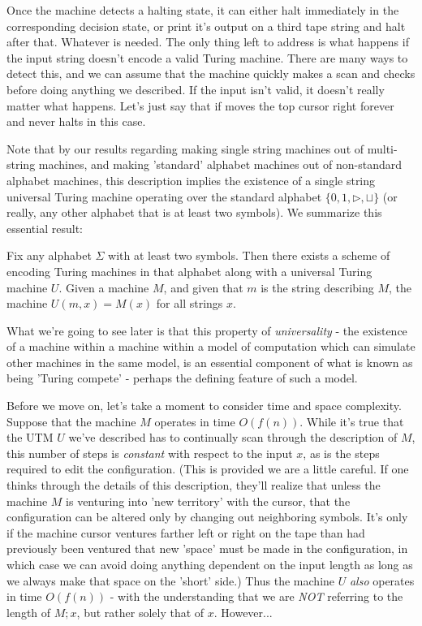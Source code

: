 Once the machine detects a halting state, it can either halt immediately in the corresponding decision state, or print it's output on a third tape string and halt after that. Whatever is needed. The only thing left to address is what happens if the input string doesn't encode a valid Turing machine. There are many ways to detect this, and we can assume that the machine quickly makes a scan and checks before doing anything we described. If the input isn't valid, it doesn't really matter what happens. Let's just say that if moves the top cursor right forever and never halts in this case. 

Note that by our results regarding making single string machines out of multi-string machines, and making 'standard' alphabet machines out of non-standard alphabet machines, this description implies the existence of a single string universal Turing machine operating over the standard alphabet $\{0,1,\triangleright,\sqcup\}$ (or really, any other alphabet that is at least two symbols). We summarize this essential result:
\begin{theorem}
	Fix any alphabet $\Sigma$ with at least two symbols. Then there exists a scheme of encoding Turing machines in that alphabet along with a universal Turing machine $U$. Given a machine $M$, and given that $m$ is the string describing $M$, the machine $U(m,x) = M(x)$ for all strings $x$. 
\end{theorem}
What we're going to see later is that this property of \textit{universality} - the existence of a machine within a machine within a model of computation which can simulate other machines in the same model, is an essential component of what is known as being 'Turing compete' - perhaps the defining feature of such a model. 

Before we move on, let's take a moment to consider time and space complexity. Suppose that the machine $M$ operates in time $O(f(n))$. While it's true that the UTM $U$ we've described has to continually scan through the description of $M$, this number of steps is \textit{constant} with respect to the input $x$, as is the steps required to edit the configuration. (This is provided we are a little careful. If one thinks through the details of this description, they'll realize that unless the machine $M$ is venturing into 'new territory' with the cursor, that the configuration can be altered only by changing out neighboring symbols. It's only if the machine cursor ventures farther left or right on the tape than had previously been ventured that new 'space' must be made in the configuration, in which case we can avoid doing anything dependent on the input length as long as we always make that space on the 'short' side.) Thus the machine $U$ \textit{also} operates in time $O(f(n))$ - with the understanding that we are \textit{NOT} referring to the length of $M;x$, but rather solely that of $x$. However...

